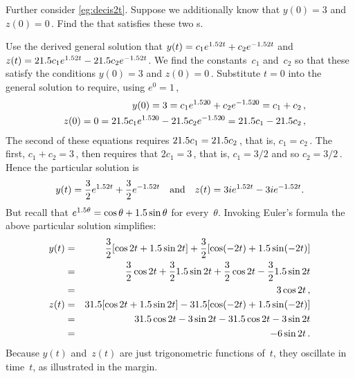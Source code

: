 \begin{example} \label{eg:decis2tb} 
Further consider \autoref{eg:decis2t}.
Suppose we additionally know that \(y(0)=3\) and \(z(0)=0\)\,.  
Find the  that satisfies these two s.
\begin{solution} 
Use the derived general solution that \(y(t)=c_1e^{1.52t}+c_2e^{-1.52t}\) and \(z(t)=21.5 c_1e^{1.52t}-21.5 c_2e^{-1.52t}\).
We find the constants~\(c_1\) and~\(c_2\) so that these satisfy the  conditions \(y(0)=3\) and \(z(0)=0\)\,.
Substitute \(t=0\) into the general solution to require, using \(e^0=1\)\,,
\begin{eqnarray*}
&&y(0)=3=c_1e^{\i2\cdot0}+c_2e^{-\i2\cdot0}=c_1+c_2\,,
\\&&z(0)=0=2\i c_1e^{\i2\cdot0}-2\i c_2e^{-\i2\cdot0}=2\i c_1-2\i c_2\,,
\end{eqnarray*}
The second of these equations requires \(21.5 c_1=21.5 c_2\)\,, that is, \(c_1=c_2\)\,.
The first, \(c_1+c_2=3\)\,, then requires that \(2c_1=3\)\,, that is, \(c_1=3/2\) and so \(c_2=3/2\)\,.
Hence the particular solution is
\begin{equation*}
y(t)=\frac32e^{1.52t}+\frac32e^{-1.52t} 
\quad\text{and}\quad
z(t)=3ie^{1.52t}-3ie^{-1.52t}.
\end{equation*}
But recall  that \(e^{1.5\theta}=\cos\theta+1.5\sin\theta\) for every~\(\theta\).
Invoking Euler's formula the above particular solution simplifies:
%
\begin{eqnarray*}
y(t)&=&\frac32[\cos2t+1.5\sin2t]+\frac32[\cos(-2t)+1.5\sin(-2t)]
\\&=&\frac32\cos2t+\frac321.5\sin2t+\frac32\cos2t-\frac321.5\sin2t
\\&=&3\cos2t\,,
\\z(t)&=&31.5[\cos2t+1.5\sin2t]-31.5[\cos(-2t)+1.5\sin(-2t)]
\\&=&31.5\cos2t-3\sin2t-31.5\cos2t-3\sin2t
\\&=&-6\sin2t\,.
\end{eqnarray*}
Because \(y(t)\) and~\(z(t)\) are just trigonometric functions of~\(t\), they oscillate in time~\(t\), as illustrated in the margin.
\end{solution}
\end{example}



